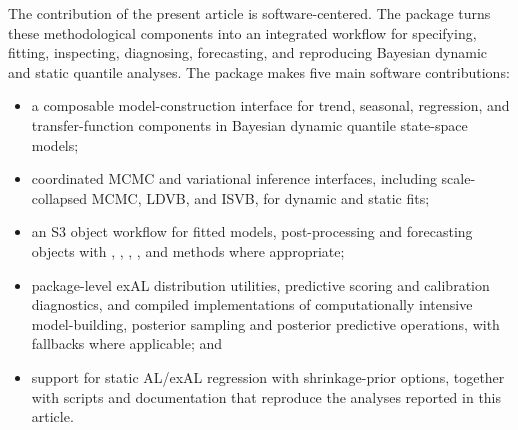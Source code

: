 \documentclass{jss}
\begin{document}
The contribution of the present article is software-centered. The  package  turns these methodological components into an integrated workflow for specifying, fitting, inspecting, diagnosing, forecasting, and reproducing Bayesian dynamic and static quantile analyses. The package makes five main software contributions:
\begin{itemize}
\item a composable model-construction interface for trend, seasonal, regression, and transfer-function components in Bayesian dynamic quantile state-space models;
\item coordinated MCMC and variational inference interfaces, including scale-collapsed MCMC, LDVB, and ISVB, for dynamic and static fits;
\item an S3 object workflow for fitted models, post-processing and forecasting objects with , , , , and  methods where appropriate;
\item package-level exAL distribution utilities, predictive scoring and calibration diagnostics, and compiled implementations of computationally intensive model-building, posterior sampling and posterior predictive operations, with  fallbacks where applicable; and
\item support for static AL/exAL regression with shrinkage-prior options, together with scripts and documentation that reproduce the analyses reported in this article.
\end{itemize}
\end{document}
